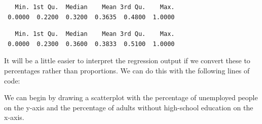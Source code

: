 \documentclass[]{article}
\newenvironment{Shaded}{\begin{snugshade}}{\end{snugshade}}
\newcommand{\KeywordTok}[1]{\textcolor[rgb]{0.13,0.29,0.53}{\textbf{#1}}}
\newcommand{\DataTypeTok}[1]{\textcolor[rgb]{0.13,0.29,0.53}{#1}}
\newcommand{\DecValTok}[1]{\textcolor[rgb]{0.00,0.00,0.81}{#1}}
\newcommand{\StringTok}[1]{\textcolor[rgb]{0.31,0.60,0.02}{#1}}
\newcommand{\OperatorTok}[1]{\textcolor[rgb]{0.81,0.36,0.00}{\textbf{#1}}}
\newcommand{\NormalTok}[1]{#1}
\theoremstyle{definition}
\theoremstyle{definition}
\theoremstyle{definition}
\theoremstyle{remark}
\begin{document}
\begin{verbatim}
   Min. 1st Qu.  Median    Mean 3rd Qu.    Max. 
 0.0000  0.2200  0.3200  0.3635  0.4800  1.0000 
\end{verbatim}

\begin{Shaded}
\end{Shaded}

\begin{verbatim}
   Min. 1st Qu.  Median    Mean 3rd Qu.    Max. 
 0.0000  0.2300  0.3600  0.3833  0.5100  1.0000 
\end{verbatim}

It will be a little easier to interpret the regression output if we
convert these to percentages rather than proportions. We can do this
with the following lines of code:

\begin{Shaded}
\end{Shaded}

We can begin by drawing a scatterplot with the percentage of unemployed
people on the y-axis and the percentage of adults without high-school
education on the x-axis.

\begin{Shaded}
\end{Shaded}
\end{document}
